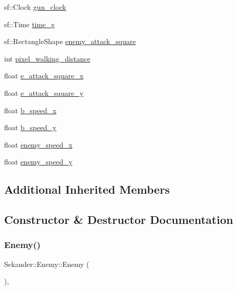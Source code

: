 \begin{DoxyCompactItemize}
\item 
sf\+::\+Clock \hyperlink{classSekander_1_1Enemy_ab92eef06a3ab1207d5611aa660211d6e}{gun\+\_\+clock}
\item 
sf\+::\+Time \hyperlink{classSekander_1_1Enemy_a1ad3f90651834f3f27b4a1c415b5ae15}{time\+\_\+g}
\item 
sf\+::\+Rectangle\+Shape \hyperlink{classSekander_1_1Enemy_ad599a3359bf97e830e840460d36ec9d3}{enemy\+\_\+attack\+\_\+square}
\item 
int \hyperlink{classSekander_1_1Enemy_a44be07820e6bb5f22675a3096d9fd12e}{pixel\+\_\+walking\+\_\+distance}
\item 
float \hyperlink{classSekander_1_1Enemy_a77dd464f39a883a164fe52b23949a5ee}{e\+\_\+attack\+\_\+square\+\_\+x}
\item 
float \hyperlink{classSekander_1_1Enemy_aebdb2d8499d594e233c25ae829525ac1}{e\+\_\+attack\+\_\+square\+\_\+y}
\item 
float \hyperlink{classSekander_1_1Enemy_aadd7613e3130e4f60274bfb22c8d983b}{b\+\_\+speed\+\_\+x}
\item 
float \hyperlink{classSekander_1_1Enemy_ab6bae906e643c667e3fddefc710a7671}{b\+\_\+speed\+\_\+y}
\item 
float \hyperlink{classSekander_1_1Enemy_ad3dc624095323fabfb2be9e4805afd24}{enemy\+\_\+speed\+\_\+x}
\item 
float \hyperlink{classSekander_1_1Enemy_a0f04d6bca363cdfcac06832f3de87aaa}{enemy\+\_\+speed\+\_\+y}
\end{DoxyCompactItemize}
\subsection*{Additional Inherited Members}


\subsection{Constructor \& Destructor Documentation}
\mbox{\label{classSekander_1_1Enemy_af9081f1217d2f9b122eaa77361139be9}} 
\subsubsection{\texorpdfstring{Enemy()}{Enemy()}\hspace{0.1cm}{\footnotesize\ttfamily [1/2]}}
{\footnotesize\ttfamily Sekander\+::\+Enemy\+::\+Enemy (\begin{DoxyParamCaption}{ }\end{DoxyParamCaption})\hspace{0.3cm}{\ttfamily [inline]}, {\ttfamily [explicit]}}

